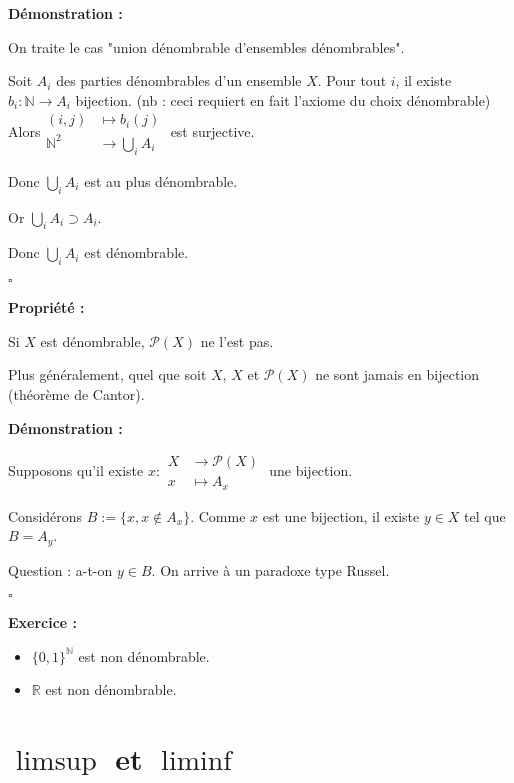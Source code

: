 \documentclass[10pt,a4paper,notitlepage ]{report}
\newcounter{th}
\newenvironment{propriete}[1][]{
	\begin{tcolorbox}
		\textbf{Propriété #1 : }
}
{\end{tcolorbox}}
\newenvironment{demo}[1][]{

	\textbf{Démonstration #1 :}
}{\begin{flushright}
	$\square$
\end{flushright}
}
\newenvironment{exo}{
	
	\textbf{Exercice :} }{}
\begin{document}
\begin{demo}
	On traite le cas "union dénombrable d'ensembles dénombrables".
	
	Soit $A_i$ des parties dénombrables d'un ensemble $X$.
	Pour tout $i$, il existe $b_i : \mathbb N \rightarrow A_i$ bijection. (nb : ceci requiert en fait l'axiome du choix dénombrable)
	Alors$ \begin{aligned}
		(i,j) &\mapsto b_i(j) \\
		\mathbb N ^2 & \rightarrow \underset{i}{\bigcup} A_i
	\end{aligned}$ est surjective.

Donc $\underset{i}{\bigcup}A_i$ est au plus dénombrable.

Or $\underset{i}{\bigcup}A_i \supset A_i$.

Donc $\underset{i}{\bigcup} A_i$ est dénombrable.
\end{demo}

\begin{propriete}
	Si $X$ est dénombrable, $\mathcal P(X)$ ne l'est pas.
	
	Plus généralement, quel que soit $X$, $X$ et $\mathcal P(X)$ ne sont jamais en bijection (théorème de Cantor).
\end{propriete}

\begin{demo}
	Supposons qu'il existe $x: \begin{aligned} X & \rightarrow \mathcal P(X) \\
		x & \mapsto A_x \end{aligned}$ une bijection.
	
	Considérons $B := \{x, x\notin A_x\}$. Comme $x$ est une bijection, il existe $y \in X$ tel que $B = A_y$.
	
	Question : a-t-on $y\in B$. On arrive à un paradoxe type Russel.
\end{demo}

\begin{exo}
\begin{itemize}	
	\item $\{0,1\}^\mathbb N$ est non dénombrable.
	
	\item $\mathbb R$ est non dénombrable.
	
\end{itemize}
\end{exo}

\section{$\limsup$ et $\liminf$}
\end{document}
